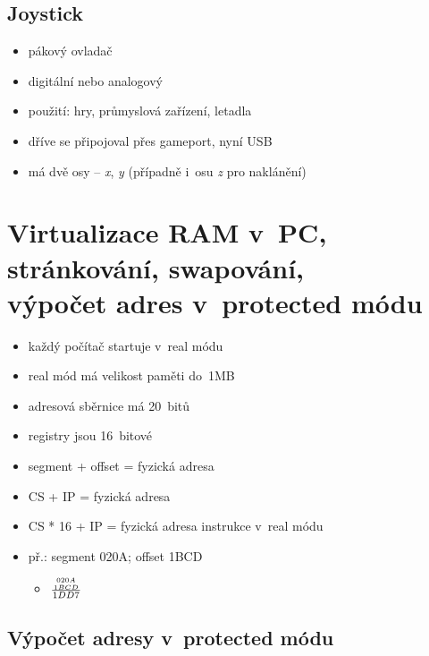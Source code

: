 \documentclass[a4paper,12pt]{article}
\providecommand{\tightlist}{%
\setlength{\itemsep}{0pt}\setlength{\parskip}{0pt}}
\begin{document}
\subsection{Joystick}

\begin{itemize}
\tightlist
\item pákový ovladač
\item digitální nebo analogový
\item použití: hry, průmyslová zařízení, letadla
\item dříve se připojoval přes gameport, nyní USB
\item má dvě osy -- \emph{x}, \emph{y} (případně i~osu \emph{z} pro
  naklánění)
\end{itemize}

\section{Virtualizace RAM v~PC, stránkování, swapování,\\výpočet adres v~protected módu}

\begin{itemize}
\tightlist
\item každý počítač startuje v~real módu
\item real mód má velikost paměti do~1MB
\item adresová sběrnice má 20~bitů
\item registry jsou 16~bitové
\item segment + offset = fyzická adresa
\item CS + IP = fyzická adresa
\item CS * 16 + IP = fyzická adresa instrukce v~real módu
\item př.: segment 020A; offset 1BCD

  \begin{itemize}
  \tightlist
    \item[] $\frac{{{020A} \atop {1BCD}}}{1DD7}$
  \end{itemize}
\end{itemize}

\subsection{Výpočet adresy v~protected módu}
\end{document}

